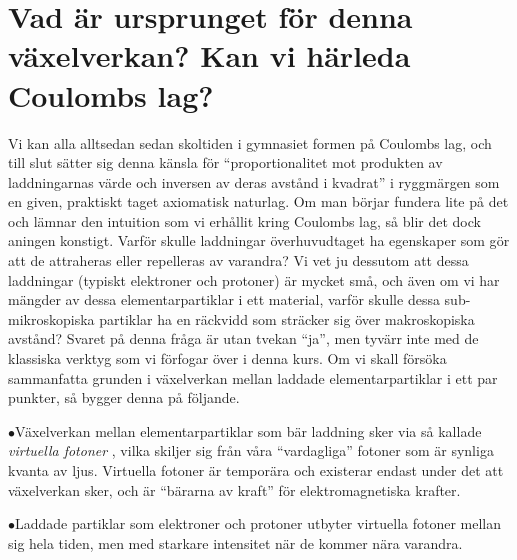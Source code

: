 {\section{Vad {\"a}r ursprunget f{\"o}r denna v{\"a}xelverkan?
  Kan vi h{\"a}rleda Coulombs lag?}
Vi kan alla alltsedan sedan skoltiden i gymnasiet formen p{\aa} Coulombs
lag,  och till slut s{\"a}tter sig denna k{\"a}nsla
f{\"o}r ``proportionalitet mot produkten av laddningarnas v{\"a}rde och
inversen av deras avst{\aa}nd i kvadrat'' i ryggm{\"a}rgen som en given,
praktiskt taget axiomatisk
naturlag. Om man b{\"o}rjar fundera lite p{\aa} det och l{\"a}mnar den
intuition som vi erh{\aa}llit kring Coulombs lag, s{\aa} blir det dock
aningen konstigt.
Varf{\"o}r skulle laddningar {\"o}verhuvudtaget ha egenskaper som g{\"o}r att
de attraheras eller repelleras av varandra? Vi vet ju dessutom att dessa
laddningar (typiskt elek\-tron\-er och protoner) {\"a}r mycket sm{\aa}, och
{\"a}ven om vi har m{\"a}ngder av dessa elementarpartiklar i ett material,
varf{\"o}r skulle dessa sub-mikroskopiska partiklar ha en r{\"a}ckvidd som
str{\"a}cker sig {\"o}ver makroskopiska avst{\aa}nd?
\medskip
{}
\medskip
\noindent
Svaret p{\aa} denna fr{\aa}ga {\"a}r utan tvekan ``ja'', men tyv{\"a}rr inte
med de klassiska verktyg som vi f{\"o}rfogar {\"o}ver i denna kurs.
Om vi skall f{\"o}rs{\"o}ka sammanfatta grunden i v{\"a}xelverkan mellan
laddade elementarpartiklar i ett par punkter, s{\aa} bygger denna p{\aa}
f{\"o}ljande.
\medskip
\item{$\bullet$}{V{\"a}xelverkan mellan elementarpartiklar som b{\"a}r laddning
  sker via s{\aa} kallade {\it virtuella fotoner} , vilka
  skiljer sig fr{\aa}n v{\aa}ra ``vardagliga'' fotoner som {\"a}r synliga kvanta
  av ljus.
  Virtuella fotoner {\"a}r tempor{\"a}ra och existerar endast under det att
  v{\"a}xelverkan sker, och {\"a}r ``b{\"a}rarna av kraft'' f{\"o}r
  elektromagnetiska krafter.}
\item{$\bullet$}{Laddade partiklar som elektroner  och
  protoner  utbyter virtuella fotoner mellan sig hela tiden,
  men med starkare intensitet n{\"a}r de kommer n{\"a}ra varandra.
}}

